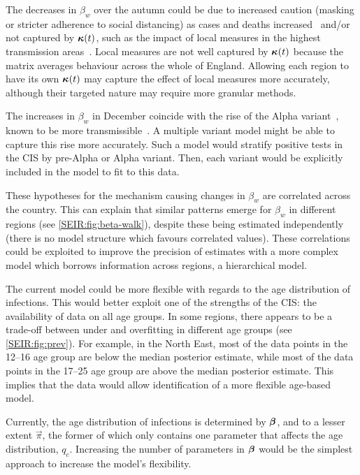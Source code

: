 \documentclass[thesis.tex]{subfiles}
\begin{document}
The decreases in $\beta_w$ over the autumn could be due to increased caution (\eg masking or stricter adherence to social distancing) as cases and deaths increased~\autocite{jarvisEffect} and/or not captured by $\bm{\kappa}(t)$, such as the impact of local measures in the highest transmission areas~\autocite{scottCovid19}.
Local measures are not well captured by $\bm{\kappa}(t)$ because the matrix averages behaviour across the whole of England.
Allowing each region to have its own $\bm{\kappa}(t)$ may capture the effect of local measures more accurately, although their targeted nature may require more granular methods.

The increases in $\beta_w$ in December coincide with the rise of the Alpha variant~\autocite{lythgoeLineage}, known to be more transmissible~\autocite[e.g.][]{daviesEstimated}.
A multiple variant model might be able to capture this rise more accurately.
Such a model would stratify positive tests in the CIS by pre-Alpha or Alpha variant.
Then, each variant would be explicitly included in the model to fit to this data.

These hypotheses for the mechanism causing changes in $\beta_w$ are correlated across the country.
This can explain that similar patterns emerge for $\beta_w$ in different regions (see \cref{SEIR:fig:beta-walk}), despite these being estimated independently (\ie there is no model structure which favours correlated values).
These correlations could be exploited to improve the precision of estimates with a more complex model which borrows information across regions, \eg a hierarchical model.

The current model could be more flexible with regards to the age distribution of infections.
This would better exploit one of the strengths of the CIS: the availability of data  on all age groups.
In some regions, there appears to be a trade-off between under and overfitting in different age groups (see \cref{SEIR:fig:prev}).
For example, in the North East, most of the data points in the 12--16 age group are below the median posterior estimate, while most of the data points in the 17--25 age group are above the median posterior estimate.
This implies that the data would allow identification of a more flexible age-based model.

Currently, the age distribution of infections is determined by $\bm{\beta}$, and to a lesser extent $\vec{\pi}$, the former of which only contains one parameter that affects the age distribution, $q_c$.
Increasing the number of parameters in $\bm{\beta}$ would be the simplest approach to increase the model's flexibility.
\end{document}
